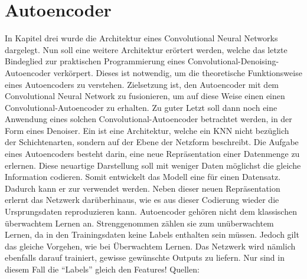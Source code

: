 \chapter{Autoencoder}\label{sec:autoencoder}
In Kapitel drei wurde die Architektur eines Convolutional Neural Networks dargelegt.
Nun soll eine weitere Architektur erörtert werden, welche das letzte Bindeglied zur
praktischen Programmierung eines Convolutional-Denoising-Autoencoder verkörpert.
Dieses ist notwendig, um die theoretische Funktionsweise eines Autoencoders zu verstehen.
Zielsetzung ist, den Autoencoder mit dem Convolutional
Neural Network zu fusionieren, um auf diese Weise einen einen
Convolutional-Autoencoder zu erhalten. Zu
guter Letzt soll dann noch eine Anwendung eines solchen
Convolutional-Autoencoder betrachtet werden, in der Form eines Denoiser.
\para{}
\bigskip
Ein  ist eine Architektur, welche ein KNN nicht
bezüglich der Schichtenarten, sondern auf der Ebene der Netzform beschreibt.
Die Aufgabe eines Autoencoders besteht darin, eine neue Repräsentation einer Datenmenge
zu erlernen. Diese neuartige Darstellung soll mit weniger Daten möglichst die gleiche
Information codieren. Somit entwickelt das Modell eine  für einen Datensatz. Dadurch kann er zur
 verwendet werden.
Neben dieser neuen Repräsentation erlernt das Netzwerk darüberhinaus, wie es
aus dieser Codierung wieder die Ursprungsdaten reproduzieren kann.
\para{}
Autoencoder gehören nicht dem klassischen überwachtem Lernen an. Strenggenommen
zählen sie zum unüberwachtem Lernen, da in den Trainingsdaten keine Labels
enthalten sein müssen. Jedoch gilt das gleiche Vorgehen, wie bei Überwachtem Lernen.
Das Netzwerk wird nämlich ebenfalls darauf trainiert, gewisse gewünschte Outputs
zu liefern. Nur sind in diesem Fall die ``Labels'' gleich den Features!
\para{}
Quellen: \cite{book:autoencoder}

